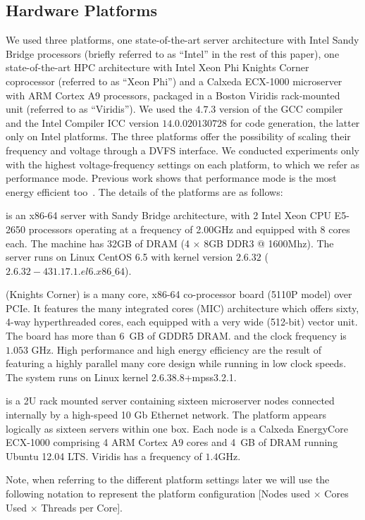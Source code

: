 \subsection{Hardware Platforms}  \label{sec:platforms:platforms}
We used three platforms, one state-of-the-art server architecture with Intel Sandy Bridge 
processors (briefly referred to as ``Intel'' in the rest of this paper),
one state-of-the-art 
HPC architecture with Intel Xeon Phi Knights Corner coprocessor 
(referred to as ``Xeon Phi'') and a Calxeda ECX-1000 microserver with 
ARM Cortex A9 processors, packaged in a Boston Viridis
rack-mounted unit (referred to as ``Viridis''). 
We used the $4.7.3$ version of the GCC compiler and the Intel Compiler ICC 
version $14.0.0 20130728$ 
for code generation, the latter only on Intel platforms.  
The three platforms offer the possibility of 
scaling their frequency and voltage through a DVFS interface.  
We conducted experiments only with the highest voltage-frequency 
settings on each 
platform, to which we refer as performance mode. Previous work shows 
that performance mode is the most energy efficient too~\cite{Georgakoudis2014}.
The details of the platforms are as follows:
\begin{description}[leftmargin=0cm]
\item[Intel] is an x86-64 server with Sandy Bridge architecture, 
             with 2 Intel Xeon CPU E5-2650 processors 
             operating at a frequency of 2.00GHz and equipped 
             with 8 cores each. The machine has 32GB of DRAM (4 $\times$ 8GB DDR3 @ 1600Mhz). 
             The server runs on Linux CentOS 6.5 with kernel 
             version $2.6.32$ ($2.6.32-431.17.1.el6.x86\_64$).
\item[Xeon Phi] (Knights Corner) is a many core, 
                x86-64 co-processor board (5110P model) over PCIe. 
                It features the many integrated cores (MIC) 
                architecture which offers sixty, 4-way hyperthreaded 
                cores, each equipped with a very wide (512-bit) vector 
                unit. The board has more than $6$~GB of GDDR5 DRAM. 
                and the clock frequency is $1.053$ GHz. 
                High performance and high energy efficiency are 
                the result of featuring a highly parallel many core 
                design while running in low clock speeds.
                The system runs on Linux kernel 2.6.38.8+mpss3.2.1.
\item[Viridis]   is a 2U rack mounted server containing sixteen  
                 microserver nodes connected internally by a high-speed 10 Gb Ethernet network. 
                 The platform appears logically as sixteen servers within one box. 
                 Each node is a Calxeda EnergyCore ECX-1000 comprising 4 ARM Cortex A9 cores and 4~GB of DRAM
                 running Ubuntu 12.04 LTS. 
                 Viridis has a frequency of $1.4$GHz.
\end{description}
Note, when referring to the different platform settings later we will use the 
following notation to represent the platform configuration 
[Nodes used $\times$ Cores Used $\times$ Threads per Core].
